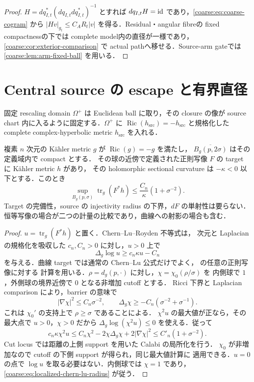 \documentclass[a4paper,11pt]{ltjsarticle}
\numberwithin{equation}{section}
\theoremstyle{plain}
\theoremstyle{definition}
\theoremstyle{remark}
\newcommand{\Ric}{\operatorname{Ric}}\newcommand{\tr}{\operatorname{tr}}\newcommand{\osc}{\operatorname{osc}}\newcommand{\vol}{\operatorname{Vol}}
\begin{document}
\begin{proof}
$H=dq_{I,t}^*(dq_{I,t}dq_{I,t}^*)^{-1}$ とすれば $dq_{I,t}H=\mathrm{id}$ であり，\eqref{coarse:eq:coarse-cogram} から
$|Hv|_{g_t}\le C_AR_t|v|$ を得る．Residual・angular fibreの fixed compactnessの下では complete model内の直径が一様であり，\cref{coarse:cor:exterior-comparison} で actual pathへ移せる．Source-arm gateでは \cref{coarse:lem:arm-fixed-ball} を用いる．
\end{proof}

\section{Central source の escape と有界直径}\label{coarse:sec:source-core}

固定 rescaling domain $\Omega^+$ は Euclidean ball に取り，その closure の像が
source chart 内に入るように固定する．$\Omega^+$ に $\Ric(h_{\mathrm{src}})=-h_{\mathrm{src}}$
と規格化した complete complex-hyperbolic metric $h_{\mathrm{src}}$ を入れる．

\begin{lemma}
\label{coarse:lem:localized-chern-lu}
複素 $n$ 次元の K\"ahler metric $g$ が $\Ric(g)=-g$ を満たし，
$\overline{B_g(p,2\sigma)}$ はその定義域内で compact とする．
その球の近傍で定義された正則写像 $F$ の target に K\"ahler metric $h$ があり，
その holomorphic sectional curvature は $-\kappa<0$ 以下とする．このとき
\begin{equation}\label{coarse:eq:localized-chern-lu-radius}
 \sup_{B_g(p,\sigma)}\tr_g(F^*h)
 \le \frac{C_n}{\kappa}(1+\sigma^{-2}).
\end{equation}
Target の完備性，source の injectivity radius の下界，$dF$ の単射性は要らない．
恒等写像の場合が二つの計量の比較であり，曲線への射影の場合も含む．
\end{lemma}

\begin{proof}
\(u=\tr_g(F^*h)\) と置く．Chern--Lu--Royden 不等式\cite{Royden}は，
次元と Laplacian の規格化を吸収した $c_n,C_n>0$ に対し，$u>0$ 上で
\[
 \Delta_g\log u\ge c_n\kappa u-C_n
\]
を与える．曲線 target では通常の Chern--Lu 公式だけでよく，
\cite[Section~1, equations~(10)--(16)]{YauSchwarzThm2} の任意の正則写像に対する
計算を用いる．$\rho=d_g(p,\cdot)$ に対し，$\chi=\chi_0(\rho/\sigma)$ を
内側球で $1$，外側球の境界近傍で $0$ となる非増加 cutoff とする．
Ricci 下界と Laplacian comparison により，barrier の意味で
\[
 |\nabla\chi|^2\le C_n\sigma^{-2},\qquad
 \Delta_g\chi\ge-C_n(\sigma^{-2}+\sigma^{-1}).
\]
これは $\chi_0'$ の支持上で $\rho\ge\sigma$ であることによる．
$\chi^2u$ の最大値が正なら，その最大点で $u>0$，$\chi>0$ だから
$\Delta_g\log(\chi^2u)\le0$ を使える．従って
\[
 c_n\kappa\chi^2u
 \le C_n\chi^2-2\chi\Delta_g\chi+2|\nabla\chi|^2
 \le C'_n(1+\sigma^{-2}).
\]
Cut locus では距離の上側 support を用いた Calabi の局所化を行う．
$\chi_0$ が非増加なので cutoff の下側 support が得られ，同じ最大値計算に
適用できる．$u=0$ の点で $\log u$ を取る必要はない．内側球では $\chi=1$ であり，
\eqref{coarse:eq:localized-chern-lu-radius} が従う．
\end{proof}
\end{document}
